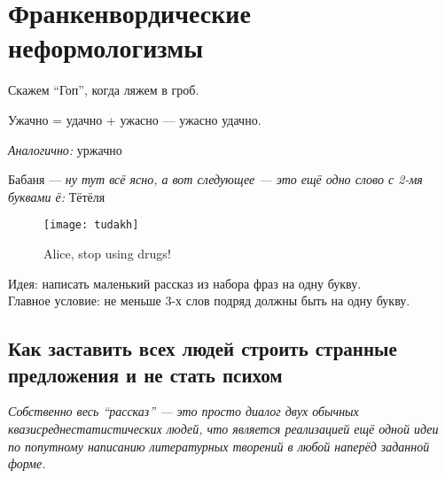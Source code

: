 \section{Франкенвордические неформологизмы}
\begin{epigraph}
    Скажем ``Гоп'', когда ляжем в гроб.
\end{epigraph}
Ужачно = удачно + ужасно --- ужасно удачно.

\emph{Аналогично:} уржачно

Бабаня --- \emph{ну тут всё ясно, а вот следующее --- это ещё одно слово с 2-мя буквами ё:} Тётёля

\begin{figure}[ht!]
    \centering
    \texttt{[image: tudakh]}
    \caption{Alice, stop using drugs!}
\end{figure}

Идея: написать маленький рассказ из набора фраз на одну букву.\\
Главное условие: не меньше 3-х слов подряд должны быть на одну букву.

\subsection{Как заставить всех людей строить странные предложения и не стать психом}
\emph{Собственно весь ``рассказ'' --- это просто диалог двух обычных квазисреднестатистических людей, что является реализацией ещё одной идеи по попутному написанию литературных творений в любой наперёд заданной форме.}

